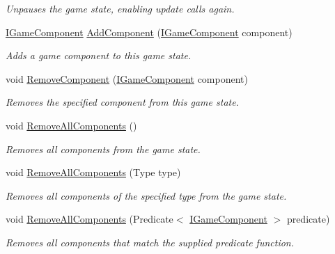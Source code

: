 \begin{DoxyCompactItemize}
\begin{DoxyCompactList}\small\item\em Unpauses the game state, enabling update calls again. \end{DoxyCompactList}\item 
\hyperlink{interface_tri_devs_1_1_tri_engine2_d_1_1_interfaces_1_1_i_game_component}{I\-Game\-Component} \hyperlink{class_tri_devs_1_1_tri_engine2_d_1_1_state_management_1_1_game_state_a49b2f8ff22d23c05ac8a9743e784db75}{Add\-Component} (\hyperlink{interface_tri_devs_1_1_tri_engine2_d_1_1_interfaces_1_1_i_game_component}{I\-Game\-Component} component)
\begin{DoxyCompactList}\small\item\em Adds a game component to this game state. \end{DoxyCompactList}\item 
void \hyperlink{class_tri_devs_1_1_tri_engine2_d_1_1_state_management_1_1_game_state_ae604dd5e2634397ee9b017e6ff5f1091}{Remove\-Component} (\hyperlink{interface_tri_devs_1_1_tri_engine2_d_1_1_interfaces_1_1_i_game_component}{I\-Game\-Component} component)
\begin{DoxyCompactList}\small\item\em Removes the specified component from this game state. \end{DoxyCompactList}\item 
void \hyperlink{class_tri_devs_1_1_tri_engine2_d_1_1_state_management_1_1_game_state_a3698c121ebec73ddb039a98bd7a3899b}{Remove\-All\-Components} ()
\begin{DoxyCompactList}\small\item\em Removes all components from the game state. \end{DoxyCompactList}\item 
void \hyperlink{class_tri_devs_1_1_tri_engine2_d_1_1_state_management_1_1_game_state_a0384d192aaf3bb18cdeb96145f64fe2d}{Remove\-All\-Components} (Type type)
\begin{DoxyCompactList}\small\item\em Removes all components of the specified type from the game state. \end{DoxyCompactList}\item 
void \hyperlink{class_tri_devs_1_1_tri_engine2_d_1_1_state_management_1_1_game_state_ae5ed08d9ca56b624068a477902de56b1}{Remove\-All\-Components} (Predicate$<$ \hyperlink{interface_tri_devs_1_1_tri_engine2_d_1_1_interfaces_1_1_i_game_component}{I\-Game\-Component} $>$ predicate)
\begin{DoxyCompactList}\small\item\em Removes all components that match the supplied predicate function. \end{DoxyCompactList}\item 

\end{DoxyCompactItemize}
